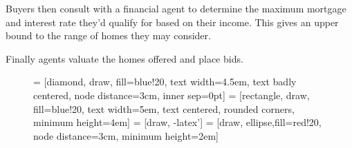 Buyers then consult with a financial agent to determine the maximum mortgage and interest rate they'd qualify for based on their income. This gives an upper bound to the range of homes they may consider. 

Finally agents valuate the homes offered and place bids. %

%
%
%

\begin{figure}[htb]
    \begin{center}
  = [diamond, draw, fill=blue!20, 
     text width=4.5em, text badly centered, node distance=3cm, inner sep=0pt]
  = [rectangle, draw, fill=blue!20, 
     text width=5em, text centered, rounded corners, minimum height=4em]
  = [draw, -latex']
  = [draw, ellipse,fill=red!20, node distance=3cm,
     minimum height=2em]
%
 \begin{center}
 \end{center}
    \caption{}
    \label{fig:code_worker_choice}
    \end{center}
\end{figure}

